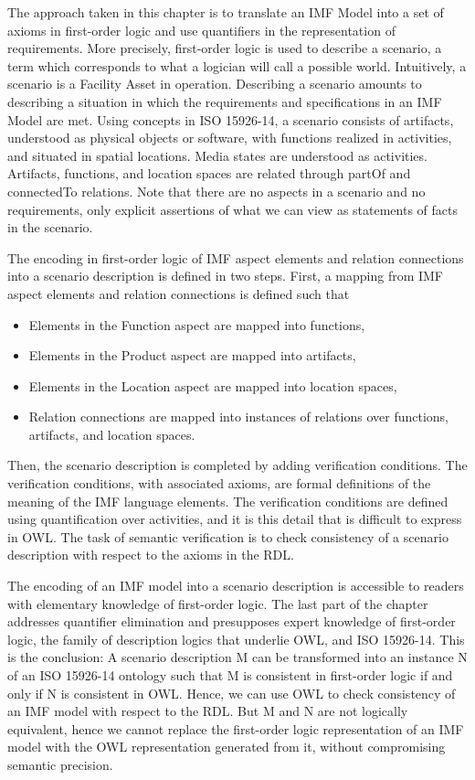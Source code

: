 The approach taken in this chapter is to translate an IMF Model into a set of axioms in first-order logic and use
quantifiers in the representation of requirements. More precisely, first-order logic is used to describe a scenario,
a term which corresponds to what a logician will call a possible world. Intuitively, a scenario is a Facility Asset
in operation. Describing a scenario amounts to describing a situation in which the requirements and specifications in
an IMF Model are met. Using concepts in ISO 15926-14, a scenario consists of artifacts, understood as physical
objects or software, with functions realized in activities, and situated in spatial locations. Media states are
understood as activities. Artifacts, functions, and location spaces are related through partOf and connectedTo
relations. Note that there are no aspects in a scenario and no requirements, only explicit assertions of what we can
view as statements of facts in the scenario.

The encoding in first-order logic of IMF aspect elements and relation connections into a scenario description is
defined in two steps. First, a mapping from IMF aspect elements and relation connections is defined such that

\begin{itemize}
  \item Elements in the Function aspect are mapped into functions,
  \item Elements in the Product aspect are mapped into artifacts,
  \item Elements in the Location aspect are mapped into location spaces,
  \item Relation connections are mapped into instances of relations over functions, artifacts, and location spaces.
\end{itemize}
Then, the scenario description is completed by adding verification conditions. The verification conditions, with
associated axioms, are formal definitions of the meaning of the IMF language elements. The verification conditions
are defined using quantification over activities, and it is this detail that is difficult to express in OWL. The task
of semantic verification is to check consistency of a scenario description with respect to the axioms in the RDL.

The encoding of an IMF model into a scenario description is accessible to readers with elementary knowledge of
first-order logic. The last part of the chapter addresses quantifier elimination and presupposes expert knowledge of
first-order logic, the family of description logics that underlie OWL, and ISO 15926-14. This is the conclusion: A
scenario description M can be transformed into an instance N of an ISO 15926-14 ontology such that M is consistent in
first-order logic if and only if N is consistent in OWL. Hence, we can use OWL to check consistency of an IMF model
with respect to the RDL. But M and N are not logically equivalent, hence we cannot replace the first-order logic
representation of an IMF model with the OWL representation generated from it, without compromising semantic
precision.

